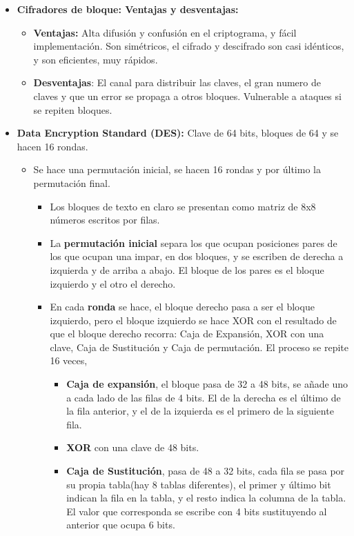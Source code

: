 \documentclass[12pt, twoside, openright]{report} %
\begin{document}
\begin{itemize}
	\item \textbf{Cifradores de bloque: Ventajas y desventajas:}
	      \begin{itemize}
		      \item \textbf{Ventajas:} Alta difusión y confusión en el criptograma, y fácil implementación. Son simétricos, el cifrado y descifrado son casi idénticos, y son eficientes, muy rápidos.
		      \item \textbf{Desventajas}: El canal para distribuir las claves, el gran numero de claves y que un error se propaga a otros bloques. Vulnerable a ataques si se repiten bloques.
	      \end{itemize}
	\item \textbf{Data Encryption Standard (DES):} Clave de 64 bits, bloques de 64 y se hacen 16 rondas.
	      \begin{itemize}
		      \item Se hace una permutación inicial, se hacen 16 rondas y por último la permutación final.
		            \begin{itemize}
			            \item Los bloques de texto en claro se presentan como matriz de 8x8 números escritos por filas.
			            \item La \textbf{permutación inicial} separa los que ocupan posiciones pares de los que ocupan una impar, en dos bloques, y se escriben de derecha a izquierda y de arriba a abajo. El bloque de los pares es el bloque izquierdo y el otro el derecho.
			            \item En cada \textbf{ronda} se hace, el bloque derecho pasa a ser el bloque izquierdo, pero el bloque izquierdo se hace XOR con el resultado de que el bloque derecho recorra: Caja de Expansión, XOR con una clave, Caja de Sustitución y Caja de permutación. El proceso se repite 16 veces,
			                  \begin{itemize}
				                  \item \textbf{Caja de expansión}, el bloque pasa de 32 a 48 bits, se añade uno a cada lado de las filas de 4 bits. El de la derecha es el último de la fila anterior, y el de la izquierda es el primero de la siguiente fila.
				                  \item \textbf{XOR} con una clave de 48 bits.
				                  \item \textbf{Caja de Sustitución}, pasa de 48 a 32 bits, cada fila se pasa por su propia tabla(hay 8 tablas diferentes), el primer y último bit indican la fila en la tabla, y el resto indica la columna de la tabla. El valor que corresponda se escribe con 4 bits sustituyendo al anterior que ocupa 6 bits.

\end{itemize}
\end{itemize}
\end{itemize}
\end{itemize}
\end{document}
